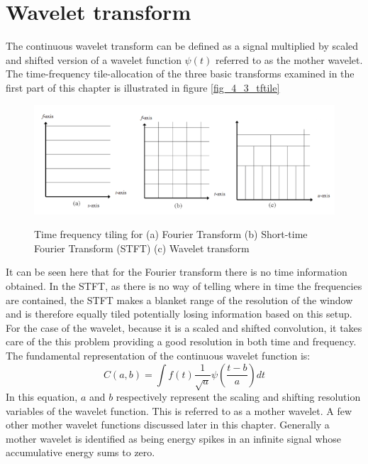 \section{Wavelet transform}
The continuous wavelet transform can be defined as a signal multiplied by scaled and shifted version of a wavelet function $\psi(t)$ referred to as the mother wavelet. The time-frequency tile-allocation of the three basic transforms examined in the first part of this chapter is illustrated in figure \ref{fig_4_3_tftile}

\begin{figure}
\centering
  \includegraphics[width=14cm]{thesis/images/tftile}\\
  \caption{Time frequency tiling for (a) Fourier Transform (b) Short-time Fourier Transform (STFT) (c) Wavelet transform}\label{fig_4_2_tftile}
\end{figure}

It can be seen here that for the Fourier transform there is no time information obtained.  In the STFT, as there is no way of telling where in time the frequencies are contained, the STFT makes a blanket range of the resolution of the window and is therefore equally tiled potentially losing information based on this setup.  For the case of the wavelet, because it is a scaled and shifted convolution, it takes care of the this problem providing a good resolution in both time and frequency.  The fundamental representation of the continuous wavelet function is:
\begin{equation}
C(a,b)=\int f(t)\frac{1}{\sqrt{a}}\psi\left(\frac{t-b}{a}\right)dt\label{eqn_c4_wavelet01}
\end{equation}
In this equation, $a$ and $b$ respectively represent the scaling and shifting resolution variables of the wavelet function. This is referred to as a mother wavelet. A few other mother wavelet functions discussed later in this chapter. Generally a mother wavelet is identified as being energy spikes in an infinite signal whose accumulative energy sums to zero.

